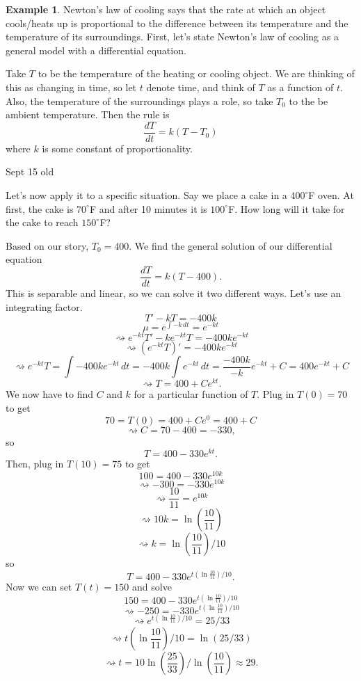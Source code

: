 \documentclass[12pt]{amsart}
\numberwithin{equation}{section}
\theoremstyle{plain} %
\newcommand{\Sept}[1]{Sept #1 old}
\newcommand{\rsa}{\rightsquigarrow}
\theoremstyle{definition}
\newtheorem{ex}[equation]{Example}
\theoremstyle{remark}
\begin{document}
\begin{ex} Newton's law of cooling says that the rate at which an object cools/heats up is proportional to the difference between its temperature and the temperature of its surroundings.  First, let's state Newton's law of cooling as a general model with a differential equation.

Take $T$ to be the temperature of the heating or cooling object. We are thinking of this as changing in time, so let $t$ denote time, and think of $T$ as a function of $t$. Also, the temperature of the surroundings plays a role, so take $T_0$ to the be ambient temperature. Then the rule is
\[ \frac{dT}{dt} = k (T-T_0)\]
where $k$ is some constant of proportionality.

\Sept{15}

Let's now apply it to a specific situation. Say we place a cake in a $400^{\circ}$F oven. At first, the cake is 
 $70^{\circ}$F and after 10 minutes it is  $100^{\circ}$F. How long will it take for the cake to reach  $150^{\circ}$F?
 
Based on our story, $T_0=400$. We find the general solution of our differential equation
\[ \frac{dT}{dt} = k (T-400).\]
This is separable and linear, so we can solve it two different ways. Let's use an integrating factor.
\[T' - kT = -400 k\]
\[ \mu = e^{\int -k \, dt} = e^{-kt}\]
\[ \rsa e^{-kt} T' - k e^{-kt} T = -400k e^{-kt}\]
\[ \rsa (e^{-kt} T) ' = -400k e^{-kt}\]
\[ \rsa e^{-kt} T = \int -400k e^{-kt} \, dt = -400k \int e^{-kt} \, dt = \frac{-400k}{-k} e^{-kt} +C =400 e^{-kt} +C\]
\[ \rsa T = 400 + C e^{kt}.\]
We now have to find $C$ and $k$ for a particular function of $T$. Plug in $T(0)=70$ to get
\[ 70 = T(0) = 400 + C e^{0} = 400 + C\]
\[\rsa C= 70-400 = -330,\]
so
\[ T= 400 -330 e^{kt}.\]
Then, plug in $T(10)=75$ to get
\[ 100 = 400 - 330 e^{10 k}\]
\[\rsa -300 = -330 e^{10 k}\]
\[ \rsa \frac{10}{11} = e^{10k}\]
\[ \rsa 10k = \ln(\frac{10}{11})\]
\[ \rsa k = \ln(\frac{10}{11})/10\]
so
\[ T = 400 - 330 e^{t (\ln\frac{10}{11}) /10}.\]
Now we can set $T(t) = 150$ and solve
\[ 150 = 400 - 330 e^{t (\ln\frac{10}{11}) /10}\]
\[ \rsa -250 = -330 e^{t (\ln \frac{10}{11}) /10}\]
\[ \rsa e^{t (\ln \frac{10}{11}) /10} = 25/33\]
\[ \rsa t (\ln \frac{10}{11}) /10 = \ln(25/33)\]
\[ \rsa t = 10 \ln(\frac{25}{33}) / \ln(\frac{10}{11}) \approx 29.\]
\end{ex}
\end{document}
